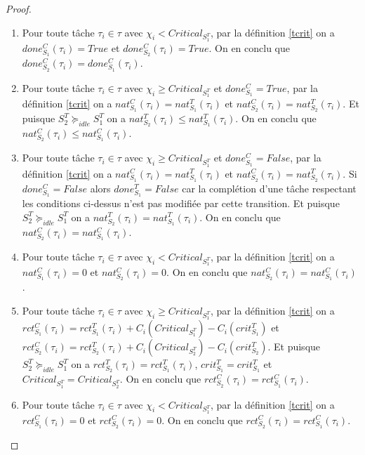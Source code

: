 \documentclass[a4paper]{report}
\theoremstyle{break}
\theoremstyle{breakplain}
\begin{document}
\begin{proof}
\begin{enumerate}
\item Pour toute tâche $\tau_i \in \tau$ avec $\chi_i < Critical_{S_1^T}$, par la définition \ref{tcrit} on a $done_{S_1}^C(\tau_i) = True$ et $done_{S_2}^C(\tau_i) = True$. On en conclu que $done_{S_2}^C(\tau_i) = done_{S_1}^C(\tau_i)$.

\item Pour toute tâche $\tau_i \in \tau$ avec $\chi_i \geq Critical_{S_1^T}$ et $done^C_{S_1} = True$, par la définition \ref{tcrit} on a $nat_{S_1}^C(\tau_i) = nat_{S_1}^T(\tau_i)$ et $nat_{S_2}^C(\tau_i) = nat_{S_2}^T(\tau_i)$. Et puisque $S^T_2 \succeq_{idle} S^T_1$ on a $nat_{S_2}^T(\tau_i)\leq nat_{S_1}^T(\tau_i)$. On en conclu que $nat_{S_2}^C(\tau_i) \leq nat_{S_1}^C(\tau_i)$.

\item Pour toute tâche $\tau_i \in \tau$ avec $\chi_i \geq Critical_{S_1^T}$ et $done^C_{S_1} = False$, par la définition \ref{tcrit} on a $nat_{S_1}^C(\tau_i) = nat_{S_1}^T(\tau_i)$ et $nat_{S_2}^C(\tau_i) = nat_{S_2}^T(\tau_i)$. Si $done^C_{S_1} = False$ alors $done^T_{S_1} = False$ car la complétion d'une tâche respectant les conditions ci-dessus n'est pas modifiée par cette transition.  Et puisque $S^T_2 \succeq_{idle} S^T_1$ on a $nat_{S_2}^T(\tau_i)= nat_{S_1}^T(\tau_i)$. On en conclu que $nat_{S_2}^C(\tau_i) = nat_{S_1}^C(\tau_i)$.

\item Pour toute tâche $\tau_i \in \tau$ avec $\chi_i < Critical_{S_1^T}$, par la définition \ref{tcrit} on a $nat_{S_1}^C(\tau_i) = 0$ et $nat_{S_2}^C(\tau_i) = 0$. On en conclu que $nat_{S_2}^C(\tau_i) = nat_{S_1}^C(\tau_i)$.


\item Pour toute tâche $\tau_i \in \tau$ avec $\chi_i \geq Critical_{S_1^T}$, par la définition \ref{tcrit} on a $rct_{S_1}^C(\tau_i) = rct_{S_1}^T(\tau_i)+C_i(Critical_{S_1^T})-C_i(crit_{S_1}^T)$ et $rct_{S_2}^C(\tau_i) = rct_{S_2}^T(\tau_i)+C_i(Critical_{S_2^T})-C_i(crit_{S_2}^T)$. Et puisque $S^T_2 \succeq_{idle} S^T_1$ on a $rct_{S_2}^T(\tau_i) = rct_{S_1}^T(\tau_i)$, $crit_{S_1}^T = crit_{S_1}^T$ et $Critical_{S_1^T} = Critical_{S_2^T}$. On en conclu que $rct_{S_2}^C(\tau_i) = rct_{S_1}^C(\tau_i)$.

\item Pour toute tâche $\tau_i \in \tau$ avec $\chi_i < Critical_{S_1^T}$, par la définition \ref{tcrit} on a $rct_{S_1}^C(\tau_i) = 0$ et $rct_{S_2}^C(\tau_i) = 0$. On en conclu que $rct_{S_2}^C(\tau_i) = rct_{S_1}^C(\tau_i)$.


\end{enumerate}
\end{proof}
\end{document}
